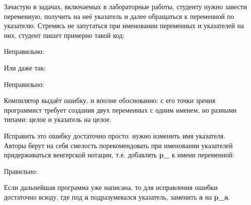 \begin{typerror}
	\label{TE_same-names-for-var-and-pointer}

	Зачастую в задачах, включаемых в лабораторные работы, студенту нужно завести переменную,
	получить на неё указатель и далее обращаться к переменной по указателю.
	Стремясь не запутаться при именовании переменных и указателей на них,
	студент пишет примерно такой код:

	Неправильно:

	Или даже так:

	Неправильно:

	Компилятор выдаёт ошибку, и вполне обоснованно:
	с его точки зрения программист требует создания двух переменных с одним именем, но разными типами:
	целое и указатель на целое.

	Исправить это ошибку достаточно просто: нужно изменить имя указателя.
	Авторы берут на себя смелость порекомендовать при именовании указателей придерживаться венгерской нотации,
	т.е. добавлять \textbf{p\_} к имени переменной:

	Правильно:

	Если дальнейшая программа уже написана, то для исправления ошибки достаточно всюду,
	где под \textbf{a} подразумевался указатель, заменить \textbf{a} на \textbf{p\_a}.

\end{typerror}
